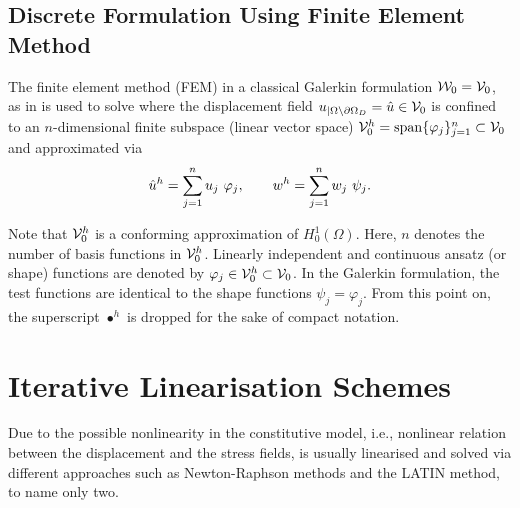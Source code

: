 \subsection{Discrete Formulation Using Finite Element Method}
The finite element method (FEM) in a classical Galerkin formulation ${\cal W}_0 = {\cal V}_0$, as in \parencite{zienkiewicz2014finite} is used to solve  where the displacement field $u_{|\Omega \setminus \partial \Omega_D} = \hat{u} \in {\cal V}_0$ is confined to an $n$-dimensional finite subspace (linear vector space) ${\cal V}_0^h = \mathrm{span} \{\varphi_j\}_{j=1}^{n} \subset {\cal V}_0$ and approximated via
\begin{equation}
	\begin{split}
		\hat{u}^h = \sum_{j=1}^{n} {u}_j \  \varphi_j, \qquad {w}^h = \sum_{j=1}^{n} w_j \  \psi_j.
	\end{split}
\end{equation}

Note that ${\cal V}_0^h$ is a conforming approximation of ${ H^1_0(\Omega)}$. Here, $n$ denotes the number of basis functions in ${\cal V}_0^h$. Linearly independent and continuous ansatz (or shape) functions are denoted by $\varphi_j \in {\cal V}_0^h \subset {\cal V}_0$. In the Galerkin formulation, the test functions are identical to the shape functions $\psi_j=\varphi_j$. From this point on, the superscript {$\bullet^h$} is dropped for the sake of compact notation.

\section{Iterative Linearisation Schemes}
Due to the possible nonlinearity in the constitutive model, i.e., nonlinear relation between the displacement and the stress fields,  is usually linearised and solved via different approaches such as Newton-Raphson methods and the LATIN method, to name only two.

